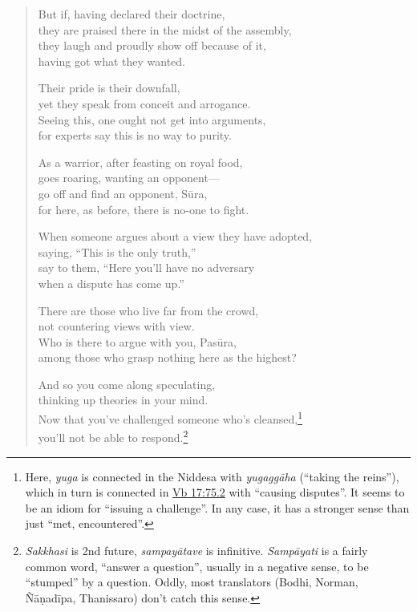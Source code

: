 \documentclass[12pt,openany]{book}%
\begin{document}
\begin{verse}
But if, having declared their doctrine, \\
they are praised there in the midst of the assembly, \\
they laugh and proudly show off because of it, \\
having got what they wanted. 

Their pride is their downfall, \\
yet they speak from conceit and arrogance. \\
Seeing this, one ought not get into arguments, \\
for experts say this is no way to purity. 

As a warrior, after feasting on royal food, \\
goes roaring, wanting an opponent—\\
go off and find an opponent, \textsanskrit{Sūra}, \\
for here, as before, there is no-one to fight. 

When someone argues about a view they have adopted, \\
saying, “This is the only truth,” \\
say to them, “Here you’ll have no adversary \\
when a dispute has come up.” 

There are those who live far from the crowd, \\
not countering views with view. \\
Who is there to argue with you, \textsanskrit{Pasūra}, \\
among those who grasp nothing here as the highest? 

And so you come along speculating, \\
thinking up theories in your mind. \\
Now that you’ve challenged someone who’s cleansed,\footnote{Here, \textit{yuga} is connected in the Niddesa with \textit{\textsanskrit{yugaggāha}} (“taking the reins”), which in turn is connected in \href{https://suttacentral.net/vb17/en/sujato\#75.2}{Vb 17:75.2} with “causing disputes”. It seems to be an idiom for “issuing a challenge”. In any case, it has a stronger sense than just “met, encountered”. } \\
you’ll not be able to respond.\footnote{\textit{Sakkhasi} is 2nd future, \textit{\textsanskrit{sampayātave}} is infinitive. \textit{\textsanskrit{Sampāyati}} is a fairly common word, “answer a question”, usually in a negative sense, to be “stumped” by a question. Oddly, most translators (Bodhi, Norman, \textsanskrit{Ñāṇadīpa}, Thanissaro) don’t catch this sense. } 

%
\end{verse}
\end{document}
